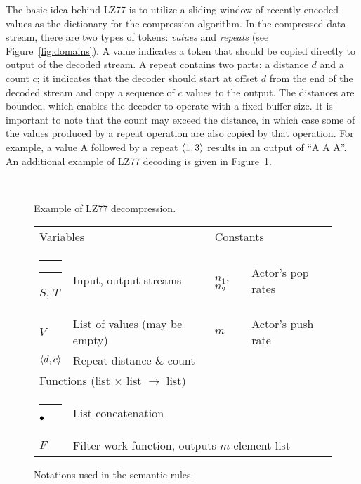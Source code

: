 The basic idea behind LZ77 is to utilize a sliding window of recently
encoded values as the dictionary for the compression algorithm.  In
the compressed data stream, there are two types of tokens: {\it
values} and {\it repeats} (see Figure~\ref{fig:domains}).  A value
indicates a token that should be copied directly to output of the
decoded stream.  A repeat contains two parts: a distance $d$ and a
count $c$; it indicates that the decoder should start at offset $d$
from the end of the decoded stream and copy a sequence of $c$ values
to the output.  The distances are bounded, which enables the decoder
to operate with a fixed buffer size.  It is important to note that the
count may exceed the distance, in which case some of the values
produced by a repeat operation are also copied by that operation.  For
example, a value A followed by a repeat $\langle1, 3\rangle$ results in an
output of ``A A A''.  An additional example of LZ77 decoding is given
in Figure~\ref{fig:lz77}.

\begin{figure}[t]
\begin{minipage}{0.21in}
\mbox{~}
\end{minipage}
\caption{Example of LZ77 decompression.
\protect\label{fig:lz77}}
\end{figure}

\newcommand{\tablesep}{\hspace{-3.5pt}}
\begin{figure}[t]
\hspace{-5pt}\begin{tabular}{llll}
\multicolumn{2}{l}{Variables} & \multicolumn{2}{l}{{\tablesep}Constants} \\ \rule[10pt]{1.9in}{0.3pt}\hspace{0.1in}\rule[10pt]{1.3in}{0.3pt}\hspace{-1.3in}\hspace{-2pt}\hspace{-1.97in}\hspace{-2pt}
$S$, $T$ & {\tablesep}Input, output streams & {\tablesep}$n_1$, $n_2$ & {\tablesep}Actor's pop rates \\
$V$ & {\tablesep}List of values (may be empty) & {\tablesep}$m$ & {\tablesep}Actor's push rate \\
$\langle d, c\rangle$ & {\tablesep}Repeat distance \& count & {\tablesep}~ & ~ \vspace{6pt} \\
\multicolumn{2}{l}{Functions (list $\times$ list $\rightarrow$ list)}& ~ & ~ \\ \rule[10pt]{3.3in}{0.3pt}\hspace{-3.3in}
$\bullet$ & {\tablesep}List concatenation & ~ & ~ \\
$F$ & \multicolumn{3}{l}{{\tablesep}Filter work function, outputs $m$-element list}
\end{tabular}
\caption{Notations used in the semantic rules.\protect\label{fig:notations}}
\end{figure}

